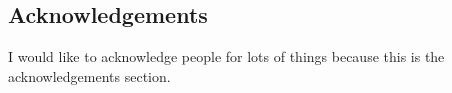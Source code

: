 \documentclass[a0,portrait]{a0poster}
\begin{document}
\begin{multicols}{2}
\begin{tcolorbox}[colframe=black,colback=blue!10!white]
\end{tcolorbox}


\begin{tcolorbox}[colframe=black,colback=blue!10!white]
\small
\normalsize

\end{tcolorbox}
\begin{tcolorbox}[colframe=black,colback=blue!10!white]

\section*{Acknowledgements}

I would like to acknowledge people for lots of things because this is the acknowledgements section.

\end{tcolorbox}


\end{multicols}
\end{document}
